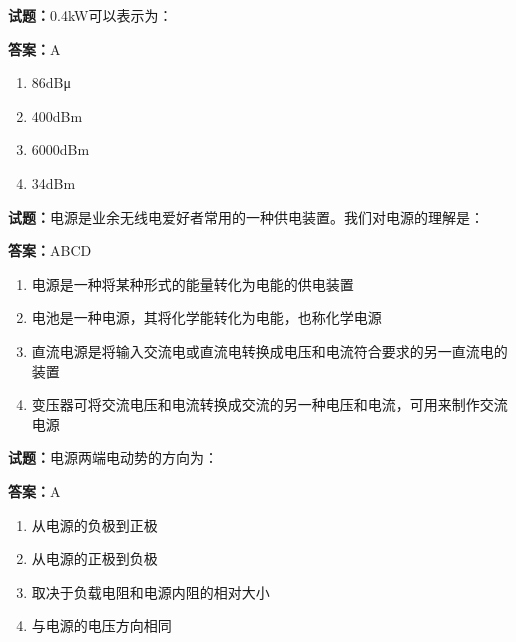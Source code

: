 \documentclass{ctexbook}
\begin{document}




\vspace{1em}

\textbf{试题：}0.4kW可以表示为： 

\textbf{答案：}A 

\begin{enumerate}[leftmargin=3em]
  \item 86dBμ 

  \item 400dBm 

  \item 6000dBm 

  \item 34dBm 

\end{enumerate}





\vspace{1em}

\textbf{试题：}电源是业余无线电爱好者常用的一种供电装置。我们对电源的理解是： 

\textbf{答案：}ABCD 

\begin{enumerate}[leftmargin=3em]
  \item 电源是一种将某种形式的能量转化为电能的供电装置 

  \item 电池是一种电源，其将化学能转化为电能，也称化学电源 

  \item 直流电源是将输入交流电或直流电转换成电压和电流符合要求的另一直流电的装置 

  \item 变压器可将交流电压和电流转换成交流的另一种电压和电流，可用来制作交流电源 

\end{enumerate}





\vspace{1em}

\textbf{试题：}电源两端电动势的方向为： 

\textbf{答案：}A 

\begin{enumerate}[leftmargin=3em]
  \item 从电源的负极到正极 

  \item 从电源的正极到负极 

  \item 取决于负载电阻和电源内阻的相对大小 

  \item 与电源的电压方向相同 

\end{enumerate}
\end{document}
